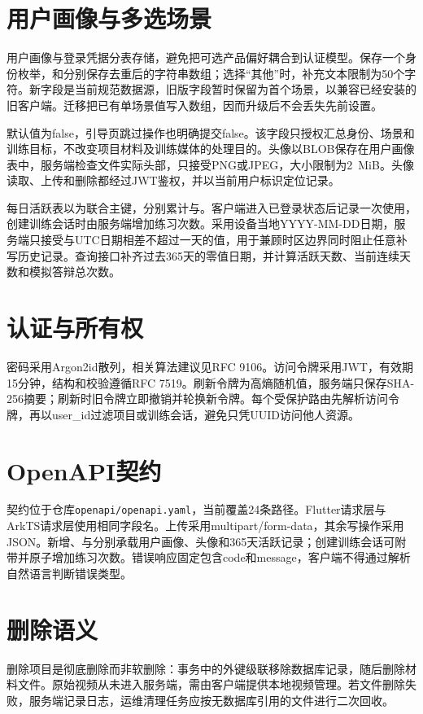 \section{用户画像与多选场景}
用户画像与登录凭据分表存储，避免把可选产品偏好耦合到认证模型。保存一个身份枚举，和分别保存去重后的字符串数组；选择“其他”时，补充文本限制为50个字符。新字段是当前规范数据源，旧版字段暂时保留为首个场景，以兼容已经安装的旧客户端。迁移把已有单场景值写入数组，因而升级后不会丢失先前设置。

默认值为false，引导页跳过操作也明确提交false。该字段只授权汇总身份、场景和训练目标，不改变项目材料及训练媒体的处理目的。头像以BLOB保存在用户画像表中，服务端检查文件实际头部，只接受PNG或JPEG，大小限制为2~MiB。头像读取、上传和删除都经过JWT鉴权，并以当前用户标识定位记录。

每日活跃表以为联合主键，分别累计与。客户端进入已登录状态后记录一次使用，创建训练会话时由服务端增加练习次数。采用设备当地YYYY-MM-DD日期，服务端只接受与UTC日期相差不超过一天的值，用于兼顾时区边界同时阻止任意补写历史记录。查询接口补齐过去365天的零值日期，并计算活跃天数、当前连续天数和模拟答辩总次数。

\section{认证与所有权}
密码采用Argon2id散列，相关算法建议见RFC 9106\cite{rfc9106}。访问令牌采用JWT，有效期15分钟，结构和校验遵循RFC 7519\cite{rfc7519}。刷新令牌为高熵随机值，服务端只保存SHA-256摘要；刷新时旧令牌立即撤销并轮换新令牌。每个受保护路由先解析访问令牌，再以user\_id过滤项目或训练会话，避免只凭UUID访问他人资源。

\section{OpenAPI契约}
契约位于仓库\texttt{openapi/openapi.yaml}，当前覆盖24条路径。Flutter请求层与ArkTS请求层使用相同字段名。上传采用multipart/form-data，其余写操作采用JSON。新增、与分别承载用户画像、头像和365天活跃记录；创建训练会话可附带并原子增加练习次数。错误响应固定包含code和message，客户端不得通过解析自然语言判断错误类型。

\section{删除语义}
删除项目是彻底删除而非软删除：事务中的外键级联移除数据库记录，随后删除材料文件。原始视频从未进入服务端，需由客户端提供本地视频管理。若文件删除失败，服务端记录日志，运维清理任务应按无数据库引用的文件进行二次回收。


